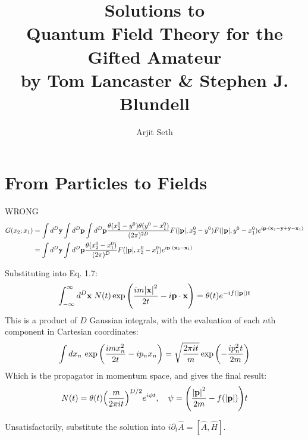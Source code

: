 \documentclass{report}
\begin{document}
\title{Solutions to \\ Quantum Field Theory for the Gifted Amateur \\ by Tom Lancaster \& Stephen J. Blundell}

\author{Arjit Seth}

\maketitle

\chapter{From Particles to Fields}
\begin{subquests}
    \item WRONG \begin{align*}
        G(x_2;x_1) & = \int d^D\vb{y} \int d^D\vb{p} \int d^D\vb{p} \frac{\theta(x_2^0 - y^0)\theta(y^0 - x_1^0)}{(2\pi)^{2D}}F(\abs{\vb p}, x_2^0 - y^0)F(\abs{\vb p}, y^0 - x_1^0)e^{i\vb p \cdot(\vb x_2 - \vb y + \vb y - \vb x_1)} \\
        & = \int d^D\vb{y} \int d^D\vb{p} \frac{\theta(x_2^0 - x_1^0)}{(2\pi)^{D}}F(\abs{\vb p}, x_2^0 - x_1^0)e^{i\vb p \cdot(\vb x_2 - \vb x_1)}
    \end{align*}
    \item Substituting into Eq. 1.7: \begin{gather*}
        \int_{-\infty}^{\infty} d^D \vb x\;N(t)\exp\pqty{\frac{im\abs{\vb x}^2}{2t} - i\vb p \cdot \vb x} = \theta(t)e^{-if(\abs {\vb p})t}
    \end{gather*}
    This is a product of $D$ Gaussian integrals, with the evaluation of each $n$th component in Cartesian coordinates:
    \begin{gather*}
        \int dx_n\, \exp\pqty{\frac{imx_n^2}{2t} - ip_nx_n} = \sqrt{\frac{2\pi i t}{m}}\exp\pqty{-\frac{ip_n^2t}{2m}}
    \end{gather*}
    Which is the propagator in momentum space, and gives the final result:
    \begin{gather*}
        N(t) = \theta(t)\pqty{\frac{m}{2\pi i t}}^{D/2}e^{i\psi t}, \quad \psi = \pqty{\frac{\abs{\vb p}^2}{2m} - f(\abs{\vb p})}t
    \end{gather*}
    \item Unsatisfactorily, substitute the solution into $i\partial_t \hat A = [\hat A, \hat H]$.

\end{subquests}
\end{document}
